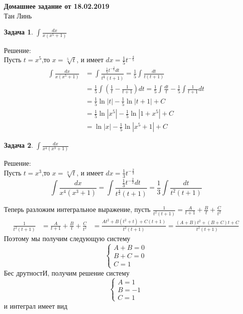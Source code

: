 \documentclass[12pt]{article}
\theoremstyle{neosn}
\newtheorem{problem}{Задача}
\begin{document}
\begin{center}
    {\bf \Large Домашнее задание от 18.02.2019}\\
    Тан Линь
\end{center}

\begin{problem}
    $\int \frac{dx}{x(x^5+1)}$
\end{problem}

Решение:\\
Пусть $t=x^5$,то $x=\sqrt[5]{t}$, и имеет $dx=\frac{1}{5}t^{-\frac{4}{5}}$
\begin{align*}
    \int \frac{dx}{x(x^5+1)} &= \int \frac{\frac{1}{5}t^{-\frac{4}{5}}dt}{t^{\frac{1}{5}}(t+1)} = \frac{1}{5}\int \frac{dt}{t(t+1)}\\
    &=\frac{1}{5} \int (\frac{1}{t}-\frac{1}{t+1})dt = \frac{1}{5}\int \frac{dt}{t} - \frac{1}{5} \int \frac{1}{t+1}dt\\
    &=\frac{1}{5}\ln|t|-\frac{1}{5}\ln|t+1| +C\\
    &=\frac{1}{5}\ln|x^5|-\frac{1}{5}\ln|1+x^5|+C\\
    &=\ln|x|-\frac{1}{5}\ln|x^5+1|+C
\end{align*}

\begin{problem}
    $\int \frac{dx}{x^4(x^3+1)}$
\end{problem}
Решение:\\
Пусть $t=x^3$,то $x = \sqrt[3]{t}$, и имеет $dx=\frac{1}{3}t^{-\frac{2}{3}}$
$$
    \int \frac{dx}{x^4(x^3+1)} = \int \frac{\frac{1}{3}t^{-\frac{2}{3}}dt}{t^{\frac{4}{3}}(t+1)}=\frac{1}{3}\int \frac{dt}{t^2(t+1)}
$$

Теперь разложим интегральное выражение, пусть $\frac{1}{t^2(t+1)}=\frac{A}{t+1}+\frac{B}{t}+\frac{C}{t^2}$
\begin{align*}
    \frac{1}{t^2(t+1)}&=\frac{A}{t+1}+\frac{B}{t}+\frac{C}{t^2}
                    &= \frac{At^2+B(t^2+t)+C(t+1)}{t^2(t+1)} = \frac{(A+B)t^2+(B+C)t+C}{t^2(t+1)}
\end{align*}
Поэтому мы получим следующую систему
\[
\begin{cases}
    A+B = 0 \\
    B+C = 0 \\
    C = 1
\end{cases}
\]
Бес друтностИ, получим решение систему
\[
    \begin{cases}
        A = 1\\
        B = -1\\
        C =1
    \end{cases}
\]
и интеграл имеет вид
\end{document}
